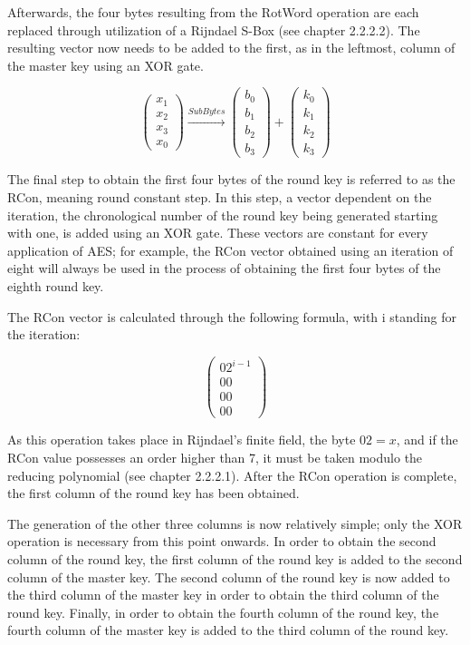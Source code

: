 \documentclass[12pt]{report}
\begin{document}
Afterwards, the four bytes resulting from the RotWord operation are each replaced through utilization of a Rijndael S-Box (see chapter 2.2.2.2). The resulting vector now needs to be added to the first, as in the leftmost, column of the master key using an XOR gate.

\[
\left( \begin{array}{c}
x_1 \\
x_2 \\
x_3 \\
x_0\end{array} \right)
\xrightarrow{SubBytes}
\left( \begin{array}{c}
b_0 \\
b_1 \\
b_2 \\
b_3\end{array} \right)
+
\left( \begin{array}{c}
k_0 \\
k_1 \\
k_2 \\
k_3\end{array} \right)
\]

The final step to obtain the first four bytes of the round key is referred to as the RCon, meaning round constant \cite[p. 15]{Rijndael} step. In this step, a vector dependent on the iteration, the chronological number of the round key being generated starting with one, is added using an XOR gate. These vectors are constant for every application of AES; for example, the RCon vector obtained using an iteration of eight will always be used in the process of obtaining the first four bytes of the eighth round key.

The RCon vector is calculated through the following formula, with i standing for the iteration:

\[ \left( \begin{array}{c}
{02}^{i-1}\\
00 \\
00 \\
00\end{array} \right) \]

As this operation takes place in Rijndael's finite field, the byte ${02} = x$, and if the RCon value possesses an order higher than 7, it must be taken modulo the reducing polynomial (see chapter 2.2.2.1). After the RCon operation is complete, the first column of the round key has been obtained.

The generation of the other three columns is now relatively simple; only the XOR operation is necessary from this point onwards. In order to obtain the second column of the round key, the first column of the round key is added to the second column of the master key. The second column of the round key is now added to the third column of the master key in order to obtain the third column of the round key. Finally, in order to obtain the fourth column of the round key, the fourth column of the master key is added to the third column of the round key.
\end{document}
